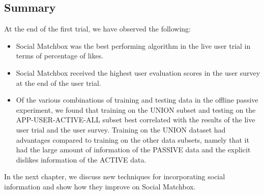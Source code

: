 \subsection{Summary}
At the end of the first trial, we have observed the following:

\begin{itemize}
\item{Social Matchbox was the best performing algorithm in the live user trial in terms of percentage of likes.}

\item{Social Matchbox received the highest user evaluation scores in the user survey at the end of the user trial.}

\item{Of the various combinations of training and testing data in the offline passive experiment, we found that training on the UNION subset and testing on the APP-USER-ACTIVE-ALL subset best correlated with the results of the live user trial and the user survey. Training on the UNION dataset had advantages compared to training on the other data subsets, namely that it had the large amount of information of the PASSIVE data and the explicit dislikes information of the ACTIVE data.}

\end{itemize}

In the next chapter, we discuss new techniques for incorporating social information and show how they improve on Social Matchbox.
